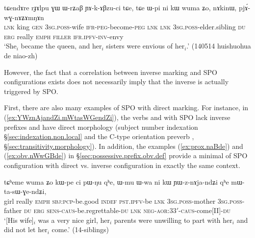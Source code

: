  \begin{exe}
\ex \label{ex:pjAwGnAZAmNAn}
 \gll tɕendɤre rɟɤlpu ɣɯ ɯ-rʑaβ ɲɤ-k-ɤβzu-ci tɕe, tɕe ɯ-pi ni kɯ wuma ʑo, nɤkinɯ, pjɤ́-wɣ-nɤʑɤmŋɤn \\
\textsc{lnk} king \textsc{gen} \textsc{3sg}.\textsc{poss}-wife \textsc{ifr}-\textsc{peg}-become-\textsc{peg} \textsc{lnk} \textsc{lnk} \textsc{3sg}.\textsc{poss}-elder.sibling \textsc{du} \textsc{erg} really \textsc{emph} \textsc{filler} \textsc{ifr}.\textsc{ipfv}-\textsc{inv}-envy \\
\glt `She$_i$ became the queen, and her$_i$ sisters were envious of her$_i$.' (140514 huishuohua de niao-zh)
\end{exe}

However, the fact that a correlation between inverse marking and SPO configurations exists does not necessarily imply that the inverse is actually triggered by SPO. 

First, there are also many examples of SPO with direct marking. For instance, in (\ref{ex:YWznAjandZi.mWtasWGendZi}), the verbs  and  with SPO lack inverse prefixes and have direct morphology (subject number indexation §\ref{sec:indexation.non.local} and the C-type orientation preverb , §\ref{sec:transitivity.morphology}). In addition, the examples (\ref{ex:prox.naBde}) and (\ref{ex:obv.nWwGBde}) in §\ref{sec:possessive.prefix.obv.def} provide a minimal of SPO configuration with direct vs. inverse configuration in exactly the same context.
\largerpage
  \begin{exe}
\ex \label{ex:YWznAjandZi.mWtasWGendZi}
 \gll  tɕʰeme wuma ʑo kɯ-pe ci pɯ-ŋu qʰe, ɯ-mu ɯ-wa ni kɯ ɲɯ-z-nɤja-ndʑi qʰe mɯ-ta-sɯ-ɣe-ndʑi, \\
 girl really \textsc{emph} \textsc{sbj}:\textsc{pcp}-be.good \textsc{indef} \textsc{pst}.\textsc{ipfv}-be \textsc{lnk} \textsc{3sg}.\textsc{poss}-mother \textsc{3sg}.\textsc{poss}-father \textsc{du} \textsc{erg} \textsc{sens}-\textsc{caus}-be.regrettable-\textsc{du} \textsc{lnk} \textsc{neg}-\textsc{aor}:3\fl{}3$'$-\textsc{caus}-come[II]-\textsc{du} \\
 \glt `[His wife]$_i$  was a very nice girl, her$_i$ parents were unwilling to part with her$_i$ and did not let her$_i$ come.' (14-siblings)
 \end{exe}
 

